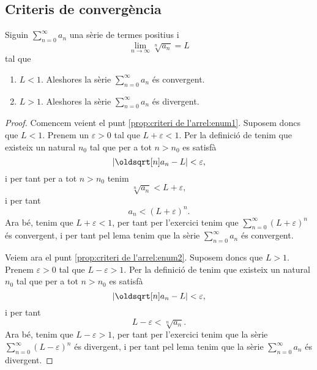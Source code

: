 \documentclass[../../Main.tex]{subfiles}
\begin{document}
	\subsection{Criteris de convergència}
	\begin{proposition}
		\label{prop:criteri de l'arrel}
		Siguin \(\sum_{n=0}^{\infty}a_{n}\) una sèrie de termes positius i
		\[\lim_{n\to\infty}\sqrt[n]{a_{n}}=L\]
		tal que
		\begin{enumerate}
			\item\label{prop:criteri de l'arrel:enum1} \(L<1\). Aleshores la sèrie \(\sum_{n=0}^{\infty}a_{n}\) és convergent.
			\item\label{prop:criteri de l'arrel:enum2} \(L>1\). Aleshores la sèrie \(\sum_{n=0}^{\infty}a_{n}\) és divergent.
		\end{enumerate}
		\begin{proof}
			Comencem veient el punt \eqref{prop:criteri de l'arrel:enum1}.  Suposem doncs que \(L<1\). Prenem un \(\varepsilon>0\) tal que \(L+\varepsilon<1\). Per la definició de  tenim que existeix un natural \(n_{0}\) tal que per a tot \(n>n_{0}\) es satisfà
			\[\abs{\sqrt[n]{a_{n}}-L}<\varepsilon,\]
			i per tant per a tot \(n>n_{0}\) tenim
			\[\sqrt[n]{a_{n}}<L+\varepsilon,\]
			i per tant
			\[a_{n}<\left(L+\varepsilon\right)^{n}.\]
			Ara bé, tenim que \(L+\varepsilon<1\), per tant per l'exercici  tenim que \(\sum_{n=0}^{\infty}(L+\varepsilon)^{n}\) és convergent, i per tant pel lema  tenim que la sèrie \(\sum_{n=0}^{\infty}a_{n}\) és convergent.
			
			Veiem ara el punt \eqref{prop:criteri de l'arrel:enum2}. Suposem doncs que \(L>1\). Prenem \(\varepsilon>0\) tal que \(L-\varepsilon>1\). Per la definició de  tenim que existeix un natural \(n_{0}\) tal que per a tot \(n>n_{0}\) es satisfà
			\[\abs{\sqrt[n]{a_{n}}-L}<\varepsilon,\]
			i per tant
			\[L-\varepsilon<\sqrt[n]{a_{n}}.\]
			Ara bé, tenim que \(L-\varepsilon>1\), per tant per l'exercici  tenim que la sèrie \(\sum_{n=0}^{\infty}(L-\varepsilon)^{n}\) és divergent, i per tant pel lema  tenim que la sèrie \(\sum_{n=0}^{\infty}a_{n}\) és divergent.
		\end{proof}
	\end{proposition}
\end{document}
